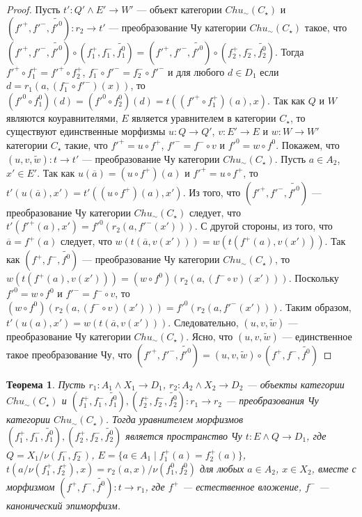 \documentclass[a4paper,12pt]{article}
\newtheorem{theorem}{Теорема}
\begin{document}
\begin{proof}
    Пусть $t': Q' \wedge E' \to W'$ --- объект категории $Chu_\sim(C_\star)$ и $(f'^+,f'^-,\widetilde{f'^0}): r_2 \to t'$ --- преобразование Чу категории $Chu_\sim(C_\star)$ такое, что $(f'^+,f'^-,\widetilde{f'^0}) \circ (f_1^+,f_1^-,\widetilde{f_1^0}) = (f'^+,f'^-,\widetilde{f'^0}) \circ (f_2^+,f_2^-,\widetilde{f_2^0})$. Тогда $f'^+ \circ f_1^+ = f'^+ \circ f_2^+$, $f_1^- \circ f'^- = f_2^- \circ f'^-$ и для любого $d \in D_1$ если $d = r_1(a,(f_1^- \circ f'^-)(x))$, то $(f'^0 \circ f_1^0)(d) = (f'^0 \circ f_2^0)(d) = t((f'^+ \circ f_1^+)(a),x)$. Так как $Q$ и $W$ являются коуравнителями, $E$ является уравнителем в категории $C_\star$, то существуют единственные морфизмы $u: Q \to Q'$, $v: E' \to E$ и $w: W \to W'$ категории $C_\star$ такие, что $f'^+ = u \circ f^+$, $f'^- = f^- \circ v$ и $f'^0 = w \circ f^0$. Покажем, что $(u,v,\widetilde{w}): t \to t'$ --- преобразование Чу категории $Chu_\sim(C_\star)$. Пусть $a \in A_2$, $x' \in E'$. Так как $u(\overline{a}) = (u \circ f^+)(a)$ и $f'^+ = u \circ f^+$, то $t'(u(\overline{a}),x') = t'((u \circ f^+)(a),x')$. Из того, что $(f'^+,f'^-,\widetilde{f'^0})$ --- преобразование Чу категории $Chu_\sim(C_\star)$ следует, что $t'(f'^+(a),x') = f'^0(r_2(a,f'^-(x')))$. С другой стороны, из того, что $\overline{a} = f^+(a)$ следует, что $w(t(\overline{a},v(x'))) = w(t(f^+(a),v(x')))$. Так как $(f^+,f^-,\widetilde{f^0})$ --- преобразование Чу категории $Chu_\sim(C_\star)$, то $w(t(f^+(a),v(x'))) = (w \circ f^0)(r_2(a,(f^- \circ v)(x')))$. Поскольку $f'^0 = w \circ f^0$ и $f'^- = f^- \circ v$, то $(w \circ f^0)(r_2(a,(f^- \circ v)(x'))) = f'^0(r_2(a,f'^-(x')))$. Таким образом, $t'(u(a),x') = w(t(\overline{a},v(x')))$. Следовательно, $(u,v,\widetilde{w})$ --- преобразование Чу категории $Chu_\sim(C_\star)$. Ясно, что $(u,v,\widetilde{w})$ --- единственное такое преобразование Чу, что $(f'^+,f'^-,\widetilde{f'^0}) = (u,v,\widetilde{w}) \circ (f^+,f^-,\widetilde{f^0})$ 
\end{proof}

\begin{theorem}
    Пусть $r_1: A_1 \wedge X_1 \to D_1$, $r_2: A_2 \wedge X_2 \to D_2$ --- объекты категории $Chu_\sim(C_\star)$ и $(f_1^+,f_1^-,\widetilde{f_1^0}), (f_2^+,f_2^-,\widetilde{f_2^0}): r_1 \to r_2$ --- преобразования Чу категории $Chu_\sim(C_\star)$. Тогда уравнителем морфизмов $(f_1^+,f_1^-,\widetilde{f_1^0}), (f_2^+,f_2^-,\widetilde{f_2^0})$ является пространство Чу $t: E \wedge Q \to D_1$, где $Q = X_1/\nu(f_1^-,f_2^-)$, $E = \{a \in A_1 \mid f_1^+(a) = f_2^+(a)\}$, $t(a/\nu(f_1^+,f_2^+),x) = r_2(a,x)/\nu(f_1^0,f_2^0)$ для любых $a \in A_2$, $x \in X_2$, вместе с морфизмом $(f^+,f^-,\widetilde{f^0}): t \to r_1$, где $f^+$ --- естественное вложение, $f^-$ --- канонический эпиморфизм. 
\end{theorem}
\end{document}
